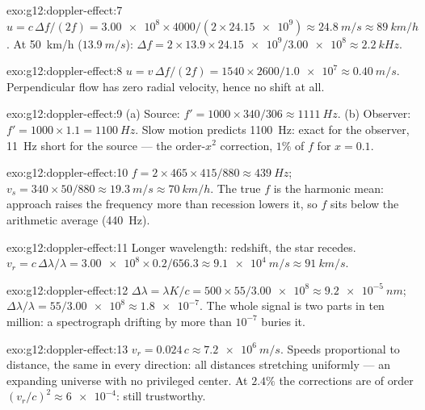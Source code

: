 \begin{solution}{exo:g12:doppler-effect:7}
$u = c\,\Delta f/(2f) = \num{3.00e8} \times 4000/(2 \times \num{24.15e9}) \approx
\qty{24.8}{m/s} \approx \qty{89}{km/h}$. At \qty{50}{km/h} ($\qty{13.9}{m/s}$):
$\Delta f = 2 \times 13.9 \times \num{24.15e9}/\num{3.00e8} \approx \qty{2.2}{kHz}$.
\end{solution}

\begin{solution}{exo:g12:doppler-effect:8}
$u = v\,\Delta f/(2f) = 1540 \times 2600/\num{1.0e7} \approx \qty{0.40}{m/s}$.
Perpendicular flow has zero radial velocity, hence no shift at all.
\end{solution}

\begin{solution}{exo:g12:doppler-effect:9}
(a) Source: $f' = 1000 \times 340/306 \approx \qty{1111}{Hz}$. (b) Observer:
$f' = 1000 \times 1.1 = \qty{1100}{Hz}$. Slow motion predicts \qty{1100}{Hz}: exact for
the observer, \qty{11}{Hz} short for the source --- the order-$x^2$ correction, $1\%$ of
$f$ for $x = 0.1$.
\end{solution}

\begin{solution}{exo:g12:doppler-effect:10}
$f = 2 \times 465 \times 415/880 \approx \qty{439}{Hz}$;
$v_s = 340 \times 50/880 \approx \qty{19.3}{m/s} \approx \qty{70}{km/h}$. The true $f$
is the harmonic mean: approach raises the frequency more than recession lowers it, so
$f$ sits below the arithmetic average (\qty{440}{Hz}).
\end{solution}

\begin{solution}{exo:g12:doppler-effect:11}
Longer wavelength: redshift, the star recedes. $v_r = c\,\Delta\lambda/\lambda =
\num{3.00e8} \times 0.2/656.3 \approx \qty{9.1e4}{m/s} \approx \qty{91}{km/s}$.
\end{solution}

\begin{solution}{exo:g12:doppler-effect:12}
$\Delta\lambda = \lambda K/c = 500 \times 55/\num{3.00e8} \approx \qty{9.2e-5}{nm}$;
$\Delta\lambda/\lambda = 55/\num{3.00e8} \approx \num{1.8e-7}$. The whole signal is two
parts in ten million: a spectrograph drifting by more than $10^{-7}$ buries it.
\end{solution}

\begin{solution}{exo:g12:doppler-effect:13}
$v_r = 0.024\,c \approx \qty{7.2e6}{m/s}$. Speeds proportional to distance, the same in
every direction: all distances stretching uniformly --- an expanding universe with no
privileged center. At $2.4\%$ the corrections are of order $(v_r/c)^2 \approx
\num{6e-4}$: still trustworthy.
\end{solution}


